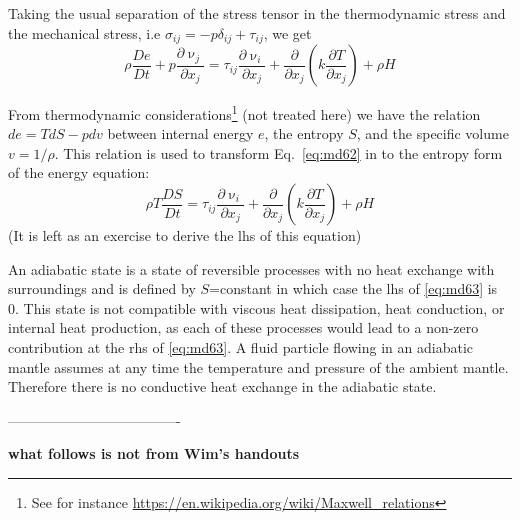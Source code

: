 Taking the usual separation of the stress tensor in the thermodynamic stress and the
mechanical stress, i.e $\sigma_{ij} = -p \delta_{ij} + \tau_{ij}$, we get
\begin{equation}
\rho \frac{De}{Dt} + p \frac{\partial \upnu_j}{\partial x_j} 
= \tau_{ij} \frac{\partial \upnu_i}{\partial x_j} + 
\frac{\partial }{\partial x_j} (k \frac{\partial T}{\partial x_j}) + \rho H
\label{eq:md62}
\end{equation}

From thermodynamic considerations\footnote{See for 
instance \url{https://en.wikipedia.org/wiki/Maxwell_relations}} (not treated here) we have the relation
$de=TdS-p dv$ between internal energy $e$, the entropy $S$, 
and the specific volume $v=1/\rho$. 
This relation is used to transform Eq.~\eqref{eq:md62} in to the entropy form of the energy
equation:
\begin{equation}
\rho T \frac{DS}{Dt} = 
\tau_{ij} \frac{\partial \upnu_i}{\partial x_j} + 
\frac{\partial }{\partial x_j} (k \frac{\partial T}{\partial x_j}) + \rho H
\label{eq:md63}
\end{equation}
(It is left as an exercise to derive the lhs of this equation)

An adiabatic state is a state of reversible processes with no heat exchange with
surroundings and is defined by $S$=constant in which case the lhs of \eqref{eq:md63} is 0. 
This state is
not compatible with viscous heat dissipation, heat conduction, or internal heat production,
as each of these processes would lead to a non-zero contribution at the rhs of \eqref{eq:md63}. 
A fluid particle flowing in an adiabatic mantle assumes at any time the temperature and pressure
of the ambient mantle. Therefore there is no conductive heat exchange in the adiabatic
state.


-------------------------------------

{\bf what follows is not from Wim's handouts}

